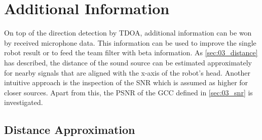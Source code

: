 \newpage
\section{Additional Information}
\label{sec:04_additionalInformation}

On top of the direction detection by \ac{TDOA}, additional information
can be won by received microphone data.
This information can be used to improve the single robot result or
to feed the team filter with beta information.
As \cref{sec:03_distance} has described, the distance of the sound source
can be estimated approximately for nearby signals that are aligned with
the x-axis of the robot's head.
Another intuitive approach is the inspection of the \ac{SNR} which
is assumed as higher for closer sources.
Apart from this, the \ac{PSNR} of the \ac{GCC} defined in \cref{sec:03_snr}
is investigated.

\subsection{Distance Approximation}
\label{subsec:04_distance}

